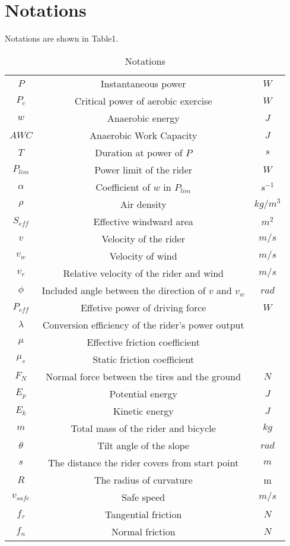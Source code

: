 \documentclass{mcmthesis}
\begin{document}
\section{Notations}

Notations are shown in Table1.
\newpage

\begin{table}[h]
	\begin{center}
		\caption{Notations}
		\begin{tabular}{ccc}
			\hline
			\makebox[0.3\textwidth][c]{Symbol}	&  \makebox[0.4\textwidth][c]{Description} &
			\makebox[0.3\textwidth][c]{Unit}\\ \hline
			$P$&Instantaneous power&$W$\\
			$P_c$&Critical power of aerobic exercise&$W$\\
			$w$&Anaerobic energy&$J$\\
			$AWC$&Anaerobic Work Capacity&$J$\\
			$T$&Duration at power of $P$&$s$\\
			$P_{lim}$&Power limit of the rider &$W$\\
			$\alpha$&Coefficient of $w$ in $P_{lim}$&$s^{-1}$\\
			$\rho$&Air density&$kg/m^3$\\
			$S_{eff}$&Effective windward area&$m^2$\\
			$v$&Velocity of the rider&$m/s$\\
			$v_w$&Velocity of wind&$m/s$\\
			$v_r$&Relative velocity of the rider and wind&$m/s$\\
			$\phi$&Included angle between the direction of $v$ and $v_w$&$rad$\\
			$P_{eff}$&Effetive power of driving force&$W$\\
			$\lambda$&Conversion efficiency of the rider's power output&\\
			$\mu$&Effective friction coefficient&\\
			$\mu_s$&Static friction coefficient&\\
			$F_N$&Normal force between the tires and the ground&$N$\\
			$E_p$&Potential energy&$J$\\
			$E_k$&Kinetic energy&$J$\\
			$m$&Total mass of the rider and bicycle&$kg$\\
			$\theta$&Tilt angle of the slope&$rad$\\
			$s$&The distance the rider covers from start point&$m$\\
			$R$&The radius of curvature&m\\
			$v_{safe}$&Safe speed&$m/s$\\
			$f_{\tau}$&Tangential friction&$N$\\
			$f_n$&Normal friction&$N$\\
			\hline
		\end{tabular}
	\end{center}
\end{table}
\end{document}

